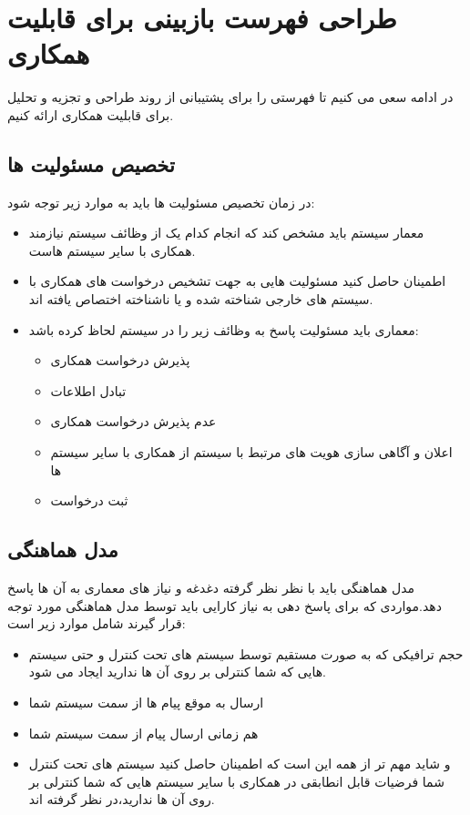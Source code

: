 \section{طراحی فهرست بازبینی برای قابلیت همکاری}

در ادامه سعی می کنیم تا فهرستی را برای پشتیبانی از روند طراحی و تجزیه و تحلیل برای قابلیت همکاری ارائه کنیم.


\subsection{تخصیص مسئولیت ها} 
در زمان تخصیص مسئولیت ها باید  به موارد زیر توجه شود:
\begin{itemize}
\item
معمار سیستم باید مشخص کند که انجام کدام یک از وظائف سیستم نیازمند همکاری با سایر سیستم هاست.
\item
اطمینان حاصل کنید مسئولیت هایی به جهت تشخیص درخواست های همکاری با سیستم های خارجی شناخته شده و یا ناشناخته اختصاص یافته اند.
\item
معماری باید مسئولیت پاسخ به وظائف زیر را در سیستم لحاظ کرده باشد:
\begin{itemize}
\item
پذیرش درخواست همکاری
\item
تبادل اطلاعات
\item
عدم پذیرش درخواست همکاری
\item
اعلان و آگاهی سازی هویت های مرتبط با سیستم از همکاری با سایر سیستم ها
\item
ثبت درخواست
\end{itemize}
\end{itemize}
\subsection{مدل هماهنگی}
مدل هماهنگی باید با نظر نظر گرفته دغدغه و نیاز های معماری به آن ها پاسخ دهد.مواردی که برای پاسخ دهی به نیاز کارایی باید توسط مدل هماهنگی مورد توجه قرار گیرند شامل موارد زیر است:
\begin{itemize}
\item
حجم ترافیکی که به صورت مستقیم توسط سیستم های تحت کنترل و حتی سیستم هایی که شما کنترلی بر روی آن ها ندارید ایجاد می شود.
\item
ارسال به موقع پیام ها از سمت سیستم شما
\item
هم زمانی ارسال پیام از سمت سیستم شما
\item
و شاید مهم تر از همه این است که اطمینان حاصل کنید سیستم های تحت کنترل شما فرضیات قابل انطابقی در همکاری با سایر سیستم هایی که شما کنترلی بر روی آن ها ندارید،‌در نظر گرفته اند.
\end{itemize}
